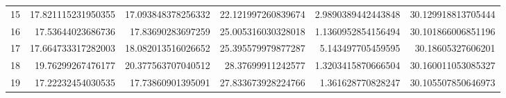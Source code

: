 \begin{tabular}{lrrrrr}
15 & 17.821115231950355 & 17.093848378256332 & 22.121997260839674 & 2.9890389442443848 & 30.129918813705444 \\
16 & 17.53644023686736 & 17.83690283697259 & 25.005316030328018 & 1.1360952854156494 & 30.101866006851196 \\
17 & 17.664733317282003 & 18.082013516026652 & 25.395579979877287 & 5.143497705459595 & 30.18605327606201 \\
18 & 19.76299267476177 & 20.377563707040512 & 28.37699911242577 & 1.3203415870666504 & 30.160011053085327 \\
19 & 17.22232454030535 & 17.73860901395091 & 27.833673928224766 & 1.361628770828247 & 30.105507850646973 \\
\hline
\end{tabular}
